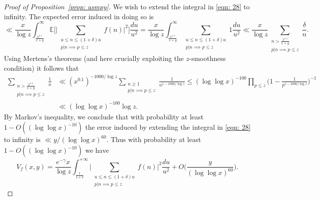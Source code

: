 \documentclass[12pt, notitlepage]{amsart}
\numberwithin{equation}{section}
\def\E{\mathbb E}
\theoremstyle{remark}
\theoremstyle{definition}
\theoremstyle{remark}
\numberwithin{equation}{section}
\begin{document}
\begin{proof}[Proof of Proposition~\ref{prop: asmpy}]
We wish to extend the integral in \eqref{eqn: 28} to infinity.  The expected error induced in doing so is 
$$
\ll \frac{x}{\log z} \int_{\frac{x^{1.1}}{x+y}}^{\infty} \E\Big [   \Big| \sum_{\substack{ u
\le n \le (1+\delta)u \\ p|n \implies p\le z  }  } f(n) \Big|^{2} \Big]\frac{du}{u^{2}} = \frac{x}{\log z} \int_{\frac{x^{1.1}}{x+y}}^{\infty} \sum_{\substack{ u
\le n \le (1+\delta)u \\ p|n \implies p\le z  }  }  1 \frac{du}{u^2} \ll \frac{x}{\log z} \sum_{\substack{ n> \frac{x^{1.1}}{x+y} \\ p|n \implies p\le z}} \frac{\delta}{n}. 
$$
Using Mertens's theorems (and here crucially exploiting the $z$-smoothness condition) it follows that   
\begin{align*}
\sum_{\substack{ n> \frac {x^{1.1}}{x+y} \\ p|n \implies p\le z}} \frac{1}{n} &\ll (x^{0.1})^{-1000/\log z} \sum_{\substack{ n\ge 1 \\ p|n \implies p\le z}} \frac{1}{n^{1-1000/\log z}} 
\le (\log \log x)^{-100} \prod_{p\le z} \Big(1 -\frac{1}{p^{1-1000/\log z}} \Big)^{-1}\\
 &\ll (\log \log x)^{-100} \log z.   
\end{align*} 
 By Markov's inequality, we conclude that with probability at least $1-O((\log \log x)^{-10})$ the error induced by extending the integral in \eqref{eqn: 28} to infinity is $\ll y/(\log \log x)^{60}$.   Thus with probability at least $1-O((\log \log x)^{-10})$ we have 
\begin{equation}\label{eqn: main}
V_f(x, y) = \frac{e^{-\gamma}x}{\log z}  \int_{\frac{1}{1+\delta}}^{+\infty} \Big|\sum_{\substack{u \le n \le (1+\delta)u \\ p|n \implies p\le z}} f(n)\Big|^{2} \frac{du}{u^{2}} +O\Big(\frac{y}{(\log \log x)^{60}}\Big).   
\end{equation}



\end{proof}
\end{document}

